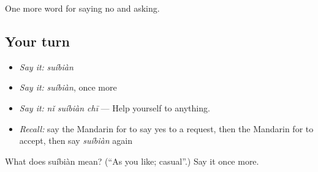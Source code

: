 \begin{grammarlens}[title={What you've built}]
One more word for saying no and asking.
\end{grammarlens}

\subsection*{Your turn}
\begin{itemize}
\raggedright
  \item \emph{Say it:} \emph{suíbiàn}
  \item \emph{Say it:} \emph{suíbiàn}, once more
  \item \emph{Say it:} \emph{nǐ suíbiàn chī} — Help yourself to anything.
  \item \emph{Recall:} say the Mandarin for to say yes to a request, then the Mandarin for to accept, then say \emph{suíbiàn} again
\end{itemize}

\begin{tcolorbox}[breakable,colback=teal!4,colframe=teal!35!black,title={Before you move on}]
What does suíbiàn mean? (\textquotedblleft{}As you like; casual\textquotedblright{}.) Say it once more.
\end{tcolorbox}
